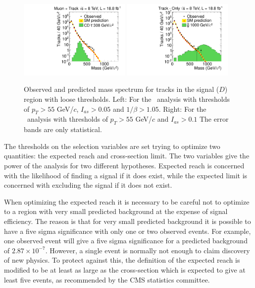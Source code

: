 \begin{figure}
 \begin{center}
  \includegraphics[clip=false, trim=0.0cm 0cm 0.0cm 0cm, width=0.48\textwidth]{figures/tkmu/RescaleNoRatio_Mass_8TeV_LooseNoSMMC}
  \includegraphics[clip=false, trim=0.0cm 0cm 0.0cm 0cm, width=0.48\textwidth]{figures/tkonly/RescaleNoRatio_Mass_8TeV_LooseNoSMMC}
 \end{center}
 \caption[Observed and predicted mass spectrum for tracks in the signal region with loose thresholds in the \tktof\ and \tkonly\ analyses.]
{Observed and predicted mass spectrum for tracks in the signal ($D$) region with loose thresholds.
Left: For the \tktof\ analysis with thresholds of $p_T > 55$ GeV/$c$, $I_{as}>0.05$ and $1/\beta>1.05$.
Right: For the \tkonly\ analysis with thresholds of $p_T > 55$ GeV/$c$ and $I_{as}>0.1$
The error bands are only statistical.}
\label{fig:MassDistribution}
\end{figure}

The thresholds on the selection variables are set trying to optimize two quantities: the expected reach and cross-section limit.
The two variables give the power of the analysis for two different hypotheses. Expected reach is concerned with the likelihood of finding a signal if it does exist, while the
expected limit is concerned with excluding the signal if it does not exist.

When optimizing the expected reach it is necessary to be careful not to optimize to
a region with very small predicted background at the expense of signal efficiency. 
The reason is that for very small predicted background it is possible to have a five sigma
significance with only one or two observed events. For example, one observed event will give a five sigma significance for a predicted background of $2.87\times10^{-7}$.
However, a single event is normally not enough to claim discovery of new physics.
To protect against this, the definition of the expected reach is modified to be at least as large as
the cross-section which is expected to give at least five events, as recommended by the CMS statistics committee.

